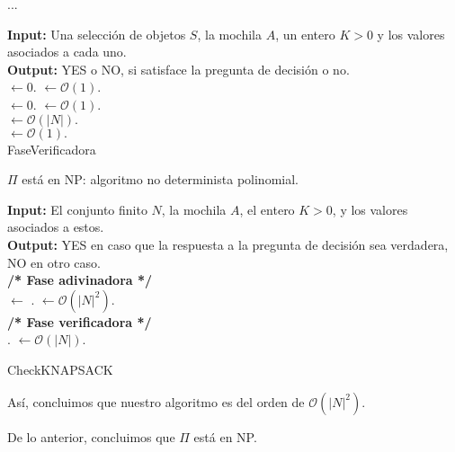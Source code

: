 \begin{frame}{...}
  
  \begin{algorithm}[H]
    \textbf{Input: } Una selección de objetos $S$,  la mochila $A$, un entero $K > 0$
    y los valores asociados a cada uno.\\
    \textbf{Output: } YES o NO, si satisface la pregunta de decisión o no.\\
     $\leftarrow 0$. $\mathbf{\leftarrow} \mathcal{O}(1).$\\
     $\leftarrow 0$. $\mathbf{\leftarrow} \mathcal{O}(1).$\\
     $\mathbf{\leftarrow} \mathcal{O}(|N|).$\\
     $\mathbf{\leftarrow} \mathcal{O}(1).$\\
    \caption{FaseVerificadora}
  \end{algorithm}
  
\end{frame}


\begin{frame}{$\Pi$ está en NP: algoritmo no determinista polinomial.}
  
  \begin{algorithm}[H]
    \textbf{Input: } El conjunto finito $N$, la mochila $A$, el entero $K > 0$,
    y los valores asociados a estos. \\
    \textbf{Output: } YES en caso que la respuesta a la pregunta de
    decisión sea verdadera, NO en otro caso.\\
    \textbf{/* Fase adivinadora */}\\
     $\leftarrow$ . $\mathbf{\leftarrow} \mathcal{O}(|N|^2).$\\
    
    \textbf{/* Fase verificadora */}\\
    \Return {}. $\mathbf{\leftarrow} \mathcal{O}(|N|).$
    \caption{CheckKNAPSACK}
  \end{algorithm}

  Así, concluimos que nuestro algoritmo es del orden de $\mathcal{O}(|N|^2).$\newline

  De lo anterior, concluimos que $\Pi$ está en NP.
\end{frame}


